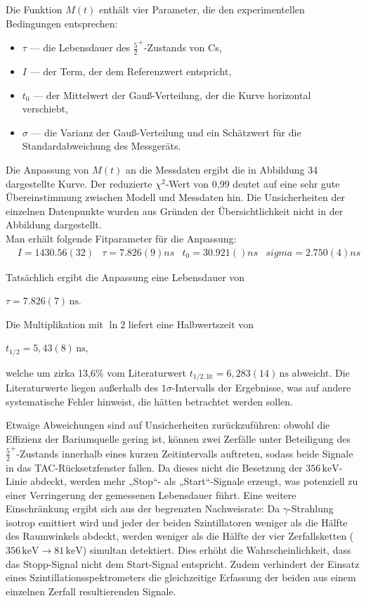 Die Funktion $M(t)$ enthält vier Parameter, die den experimentellen Bedingungen entsprechen:
\begin{itemize}
\item $\tau$ — die Lebensdauer des $\frac{5}{2}^+$-Zustands von Cs,
\item $I$ — der Term, der dem Referenzwert entspricht,
\item $t_0$ — der Mittelwert der Gauß-Verteilung, der die Kurve horizontal verschiebt,
\item $\sigma$ — die Varianz der Gauß-Verteilung und ein Schätzwert für die Standardabweichung des Messgeräts.
\end{itemize}

Die Anpassung von $M(t)$ an die Messdaten ergibt die in Abbildung 34 dargestellte Kurve. Der reduzierte $\chi^2$-Wert von 0,99 deutet auf eine sehr gute Übereinstimmung zwischen Modell und Messdaten hin. Die Unsicherheiten der einzelnen Datenpunkte wurden aus Gründen der Übersichtlichkeit nicht in der Abbildung dargestellt.\\
Man erhält folgende Fitparameter für die Anpassung:
\begin{align*}
    &I     = 1430.56(32)
    &\tau   = 7.826(9) ns
    &t_0    = 30.921() ns
    &sigma = 2.750(4) ns
\end{align*}

Tatsächlich ergibt die Anpassung eine Lebensdauer von

$\tau = 7.826(7)\,\mathrm{ns}.$

Die Multiplikation mit $\ln 2$ liefert eine Halbwertszeit von

$t_{1/2} = 5,43(8)\,\mathrm{ns},$

welche um zirka 13,6\% vom Literaturwert $t_{1/2,\mathrm{lit}} = 6,283(14)\,\mathrm{ns}$ abweicht. Die Literaturwerte liegen außerhalb des $1\sigma$-Intervalls der Ergebnisse, was auf andere systematische Fehler hinweist, die hätten betrachtet werden sollen.

Etwaige Abweichungen sind auf Unsicherheiten zurückzuführen: obwohl die Effizienz der Bariumquelle gering ist, können zwei Zerfälle unter Beteiligung des $\frac{5}{2}^+$-Zustands innerhalb eines kurzen Zeitintervalls auftreten, sodass beide Signale in das TAC-Rücksetzfenster fallen. Da dieses nicht die Besetzung der $356\,\mathrm{keV}$-Linie abdeckt, werden mehr „Stop“- als „Start“-Signale erzeugt, was potenziell zu einer Verringerung der gemessenen Lebensdauer führt. Eine weitere Einschränkung ergibt sich aus der begrenzten Nachweisrate: Da $\gamma$-Strahlung isotrop emittiert wird und jeder der beiden Szintillatoren weniger als die Hälfte des Raumwinkels abdeckt, werden weniger als die Hälfte der vier Zerfallsketten ($356\,\mathrm{keV} \rightarrow 81\,\mathrm{keV}$) simultan detektiert. Dies erhöht die Wahrscheinlichkeit, dass das Stopp-Signal nicht dem Start-Signal entspricht. Zudem verhindert der Einsatz eines Szintillationsspektrometers die gleichzeitige Erfassung der beiden aus einem einzelnen Zerfall resultierenden Signale.

